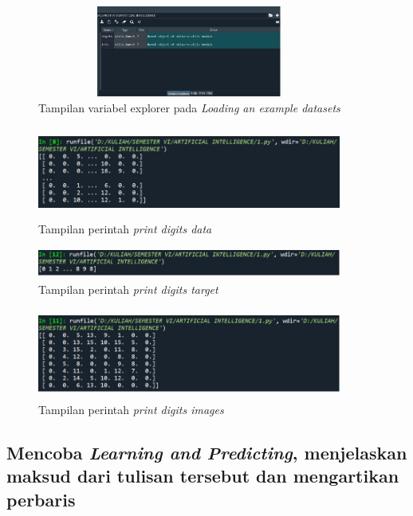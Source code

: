 \documentclass{article}
\begin{document}
    \begin{figure}[!htbp]
            \centering
            \includegraphics[width=10cm,height=3cm]{figures/1184101/chapter1/18.jpeg}
            \caption{Tampilan variabel explorer pada \textit{Loading an example datasets}}
            \label{penanda}
            \end{figure}
    \begin{figure}[!htbp]
            \centering
            \includegraphics[width=10cm,height=3cm]{figures/1184101/chapter1/6.jpeg}
            \caption{Tampilan perintah \textit{print digits data}}
            \label{penanda}
            \end{figure}
    \begin{figure}[!htbp]
            \centering
            \includegraphics[width=10cm,height=1cm]{figures/1184101/chapter1/7.jpeg}
            \caption{Tampilan perintah \textit{print digits target}}
            \label{penanda}
            \end{figure}
    \begin{figure}[!htbp]
            \centering
            \includegraphics[width=10cm,height=3cm]{figures/1184101/chapter1/8.jpeg}
            \caption{Tampilan perintah \textit{print digits images}}
            \label{penanda}
            \end{figure}
    
\subsection{Mencoba \textit{Learning and Predicting}, menjelaskan maksud dari tulisan tersebut dan mengartikan perbaris}
\end{document}
